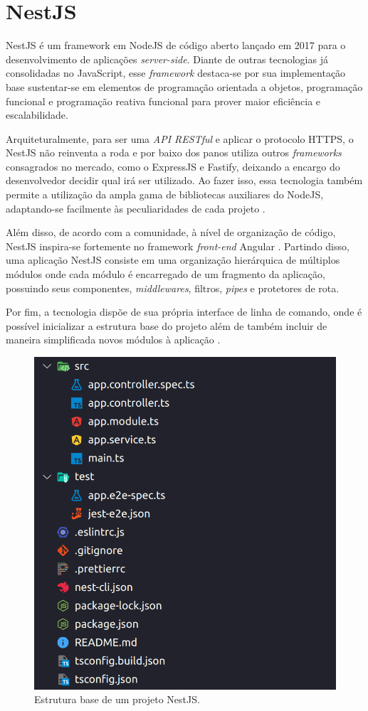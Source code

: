 \section{NestJS}
\label{sec:nestjs}
NestJS é um framework em NodeJS de código aberto lançado em 2017 para o desenvolvimento de aplicações \textit{server-side}. Diante de outras tecnologias já consolidadas no JavaScript, esse \textit{framework} destaca-se por sua implementação base sustentar-se em elementos de programação orientada a objetos, programação funcional e programação reativa funcional para prover maior eficiência e escalabilidade.

Arquiteturalmente, para ser uma \textit{API RESTful} e aplicar o protocolo HTTPS, o NestJS não reinventa a roda e por baixo dos panos utiliza outros \textit{frameworks} consagrados no mercado, como o ExpressJS e Fastify, deixando a encargo do desenvolvedor decidir qual irá ser utilizado. Ao fazer isso, essa tecnologia também permite a utilização da ampla gama de bibliotecas auxiliares do NodeJS, adaptando-se facilmente às peculiaridades de cada projeto \cite{Mysliwiec2023}.

Além disso, de acordo com a comunidade, à nível de organização de código, NestJS inspira-se fortemente no framework \textit{front-end} Angular \cite{Passos2018}. Partindo disso, uma aplicação NestJS consiste em uma organização hierárquica de múltiplos módulos onde cada módulo é encarregado de um fragmento da aplicação, possuindo seus componentes, \textit{middlewares}, filtros, \textit{pipes} e protetores de rota.

Por fim, a tecnologia dispõe de sua própria interface de linha de comando, onde é possível inicializar a estrutura base do projeto além de também incluir de maneira simplificada novos módulos à aplicação \cite{Mysliwiec2023a}.

\begin{figure}[H]
    \centering
    \caption{Estrutura base de um projeto NestJS.}
    \label{fig:nestjs}
    \includegraphics[width=.4\textwidth]{data/figures/nest.png}
\end{figure}